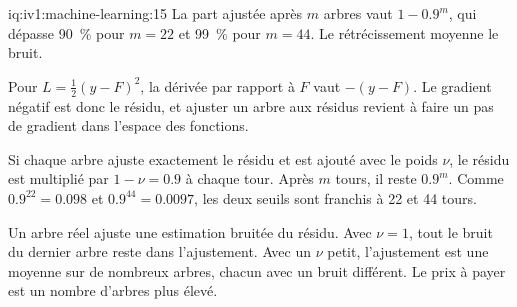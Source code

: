 \begin{solution}{iq:iv1:machine-learning:15}
La part ajustée après $m$ arbres vaut $1 - 0.9^m$, qui dépasse 90~\% pour $m = 22$ et 99~\% pour $m = 44$. Le rétrécissement moyenne le bruit.

Pour $L = \frac12(y - F)^2$, la dérivée par rapport à $F$ vaut $-(y - F)$. Le gradient négatif est donc le résidu, et ajuster un arbre aux résidus revient à faire un pas de gradient dans l'espace des fonctions.

Si chaque arbre ajuste exactement le résidu et est ajouté avec le poids $\nu$, le résidu est multiplié par $1 - \nu = 0.9$ à chaque tour. Après $m$ tours, il reste $0.9^m$. Comme $0.9^{22} = 0.098$ et $0.9^{44} = 0.0097$, les deux seuils sont franchis à 22 et 44 tours.

Un arbre réel ajuste une estimation bruitée du résidu. Avec $\nu = 1$, tout le bruit du dernier arbre reste dans l'ajustement. Avec un $\nu$ petit, l'ajustement est une moyenne sur de nombreux arbres, chacun avec un bruit différent. Le prix à payer est un nombre d'arbres plus élevé.



\end{solution}

